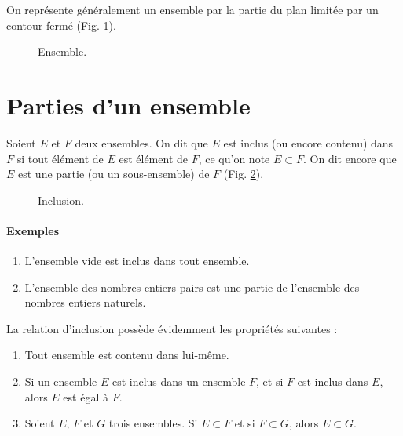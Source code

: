 \documentclass[12pt,parskip=full,chapterprefix=true,a5paper]{scrbook}
\begin{document}
On représente généralement un ensemble par la partie du plan limitée par un contour fermé (Fig. \ref{fig:ensemble}).

\begin{figure}[ht]
  \centering
  \caption{\label{fig:ensemble}Ensemble.}
\end{figure}

\section{Parties d'un ensemble}
Soient \(E\) et \(F\) deux ensembles. On dit que \(E\) est inclus (ou encore contenu) dans \(F\) si tout élément de \(E\) est élément de \(F\), ce qu'on note \(E\subset F\). On dit encore que \(E\) est une partie (ou un sous-ensemble) de \(F\) (Fig. \ref{fig:inclusion}).

\begin{figure}[ht]
  \centering
  \caption{\label{fig:inclusion}Inclusion.}
\end{figure}

\paragraph{Exemples}
\begin{enumerate}
\item L'ensemble vide est inclus dans tout ensemble.
\item L'ensemble des nombres entiers pairs est une partie de l'ensemble des nombres entiers naturels.
\end{enumerate}

La relation d'inclusion possède évidemment les propriétés suivantes :
\begin{enumerate}[label=\alph*)]
\item Tout ensemble est contenu dans lui-même.
\item Si un ensemble \(E\) est inclus dans un ensemble \(F\), et si \(F\) est inclus dans \(E\), alors \(E\) est égal à \(F\).
\item Soient \(E\), \(F\) et \(G\) trois ensembles. Si \(E\subset F\) et si \(F\subset G\), alors \(E\subset G\).
\end{enumerate}
\end{document}
